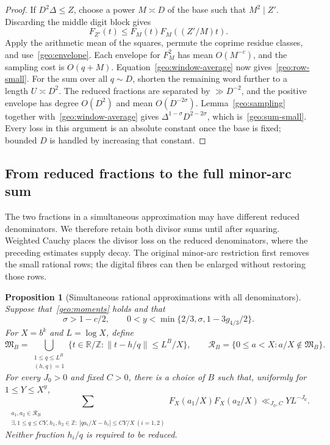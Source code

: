 \documentclass[11pt,a4paper]{article}
\theoremstyle{paperplain}
\newtheorem{proposition}[theorem]{Proposition}
\numberwithin{equation}{section}
\begin{document}
\begin{proof}
If $D^2\Delta\le Z$, choose a power $M\asymp D$ of the base such that
$M^2\mid Z'$. Discarding the middle digit block gives
\[
 F_{Z'}(t)\le F_M(t)F_M((Z'/M)t).
\]
Apply the arithmetic mean of the squares, permute the coprime residue
classes, and use~\eqref{geo:envelope}. Each envelope for $F_M^2$ has mean
$O(M^{-c})$, and the sampling cost is $O(q+M)$.
Equation~\eqref{geo:window-average} now gives~\eqref{geo:row-small}.
For the sum over all $q\sim D$, shorten the remaining word further to a length
$U\asymp D^2$. The reduced fractions are separated by $\gg D^{-2}$,
and the positive envelope has degree $O(D^2)$ and mean $O(D^{-2\sigma})$.
Lemma~\ref{geo:sampling} together with~\eqref{geo:window-average} gives
$\Delta^{1-\sigma}D^{2-2\sigma}$, which is~\eqref{geo:sum-small}.
Every loss in this argument is an absolute constant once the base is fixed;
bounded $D$ is handled by increasing that constant.
\end{proof}

\subsection{From reduced fractions to the full minor-arc sum}

The two fractions in a simultaneous approximation may have different
reduced denominators. We therefore retain both divisor sums until after
squaring. Weighted Cauchy places the divisor loss on the reduced
denominators, where the preceding estimates supply decay. The original
minor-arc restriction first removes the small rational rows; the digital
fibres can then be enlarged without restoring those rows.

\begin{proposition}[Simultaneous rational approximations with all denominators]\label{geo:all-denom}
Suppose that~\eqref{geo:moments} holds and that
\begin{equation}\label{geo:range-y}
 \sigma>1-c/2,\qquad
 0<y<\min\{2/3,\sigma,1-3g_{4/3}/2\}.
\end{equation}
For $X=b^k$ and $L=\log X$, define
\[
 \mathfrak M_B=
 \bigcup_{\substack{1\le q\le L^B\\(h,q)=1}}
 \{t\in\mathbb R/\mathbb Z:\|t-h/q\|\le L^B/X\},
 \qquad
 \mathcal R_B=\{0\le a<X:a/X\notin\mathfrak M_B\}.
\]
For every $J_0>0$ and fixed $C>0$, there is a choice of $B$ such that,
uniformly for $1\le Y\le X^y$,
\begin{equation}\label{geo:all-denom-bound}
 \sum_{\substack{a_1,a_2\in\mathcal R_B\\
 \exists,1\le q\le CY, h_1,h_2\in\mathbb Z:\
 |qa_i/X-h_i|\le CY/X\ (i=1,2)}}
 F_X(a_1/X)F_X(a_2/X)
 \ll_{J_0,C}Y L^{-J_0}.
\end{equation}
Neither fraction $h_i/q$ is required to be reduced.
\end{proposition}
\end{document}

